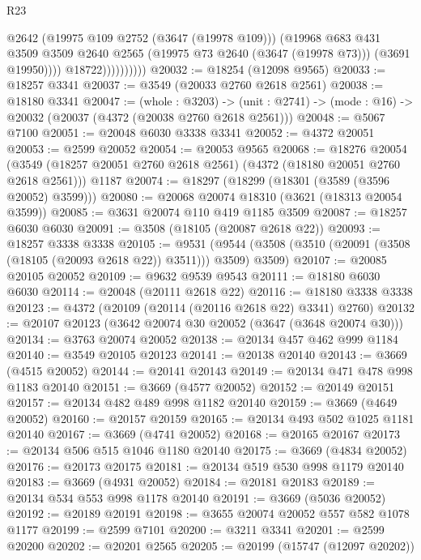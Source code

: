 \begin{lexlean}{R23}
\begin{coremodule}
                            @2642
                            (@19975 @109 @2752 (@3647 (@19978 @109)))
                            (@19968
                              @683
                              @431
                              @3509
                              @3509
                              @2640
                              @2565
                              (@19975 @73 @2640 (@3647 (@19978 @73)))
                              (@3691 @19950))))
                        @18722))))))))))
@20032 := @18254 (@12098 @9565)
@20033 := @18257 @3341
@20037 := @3549 (@20033 @2760 @2618 @2561)
@20038 := @18180 @3341
@20047 := (whole : @3203) ->
  (unit : @2741) -> (mode : @16) -> @20032 (@20037 (@4372 (@20038 @2760 @2618 @2561)))
@20048 := @5067 @7100
@20051 := @20048 @6030 @3338 @3341
@20052 := @4372 @20051
@20053 := @2599 @20052
@20054 := @20053 @9565
@20068 := @18276
    @20054
    (@3549 (@18257 @20051 @2760 @2618 @2561) (@4372 (@18180 @20051 @2760 @2618 @2561)))
    @1187
@20074 := @18297 (@18299 (@18301 (@3589 (@3596 @20052) @3599)))
@20080 := @20068 @20074 @18310 (@3621 (@18313 @20054 @3599))
@20085 := @3631 @20074 @110 @419 @1185 @3509
@20087 := @18257 @6030 @6030
@20091 := @3508 (@18105 (@20087 @2618 @22))
@20093 := @18257 @3338 @3338
@20105 := @9531
    (@9544 (@3508 (@3510 (@20091 (@3508 (@18105 (@20093 @2618 @22)) @3511))) @3509) @3509)
@20107 := @20085 @20105 @20052
@20109 := @9632 @9539 @9543
@20111 := @18180 @6030 @6030
@20114 := @20048 (@20111 @2618 @22)
@20116 := @18180 @3338 @3338
@20123 := @4372 (@20109 (@20114 (@20116 @2618 @22) @3341) @2760)
@20132 := @20107 @20123 (@3642 @20074 @30 @20052 (@3647 (@3648 @20074 @30)))
@20134 := @3763 @20074 @20052
@20138 := @20134 @457 @462 @999 @1184
@20140 := @3549 @20105 @20123
@20141 := @20138 @20140
@20143 := @3669 (@4515 @20052)
@20144 := @20141 @20143
@20149 := @20134 @471 @478 @998 @1183 @20140
@20151 := @3669 (@4577 @20052)
@20152 := @20149 @20151
@20157 := @20134 @482 @489 @998 @1182 @20140
@20159 := @3669 (@4649 @20052)
@20160 := @20157 @20159
@20165 := @20134 @493 @502 @1025 @1181 @20140
@20167 := @3669 (@4741 @20052)
@20168 := @20165 @20167
@20173 := @20134 @506 @515 @1046 @1180 @20140
@20175 := @3669 (@4834 @20052)
@20176 := @20173 @20175
@20181 := @20134 @519 @530 @998 @1179 @20140
@20183 := @3669 (@4931 @20052)
@20184 := @20181 @20183
@20189 := @20134 @534 @553 @998 @1178 @20140
@20191 := @3669 (@5036 @20052)
@20192 := @20189 @20191
@20198 := @3655 @20074 @20052 @557 @582 @1078 @1177
@20199 := @2599 @7101
@20200 := @3211 @3341
@20201 := @2599 @20200
@20202 := @20201 @2565
@20205 := @20199 (@15747 (@12097 @20202))

\end{coremodule}
\end{lexlean}

